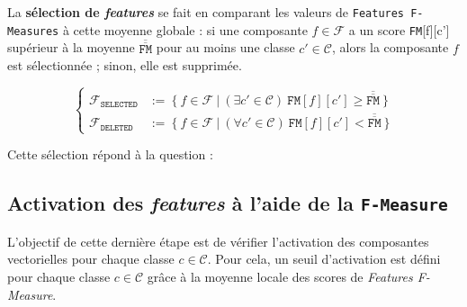 		
		La \textbf{sélection de \textit{features}} se fait en comparant les valeurs de \texttt{Features F-Measures} à cette moyenne globale : si une composante $f \in \mathcal{F}$ a un score \texttt{FM}[f][c'] supérieur à la moyenne $\overline{\overline{\texttt{FM}}}$ pour au moins une classe $c' \in \mathcal{C}$, alors la composante $f$ est sélectionnée ; sinon, elle est supprimée.
		
		\begin{equation}
			\label{equation:C.3.1-DESCRIPTION-IMPLEMENTATION-FEATURES-MAXIMIZATION-METRIC-FEATURES-SELECTION}
			\begin{cases}
				\mathcal{F}_{\texttt{SELECTED}}
					& :=~\bigl\{~
						f \in \mathcal{F}
						~\big|~
						(\exists c' \in \mathcal{C})~\texttt{FM}[f][c'] \geq \overline{\overline{\texttt{FM}}}
					~\bigr\} \\
				\mathcal{F}_{\texttt{DELETED}}
					& :=~\bigl\{~
						f \in \mathcal{F}
						~\big|~
						(\forall c' \in \mathcal{C})~\texttt{FM}[f][c'] < \overline{\overline{\texttt{FM}}}
					~\bigr\}
			\end{cases}
		\end{equation}
		
		\begin{leftBarAuthorOpinion}
			Cette sélection répond à la question :
		\end{leftBarAuthorOpinion}
	
	
	\subsection{Activation des \textit{features} à l'aide de la \texttt{F-Measure}}
	\label{annex:C.3.3-DESCRIPTION-IMPLEMENTATION-FEATURES-MAXIMIZATION-METRIC-ACTIVATION-FEATURES}
	
		L'objectif de cette dernière étape est de vérifier l'activation des composantes vectorielles pour chaque classe $c \in \mathcal{C}$.
		Pour cela, un seuil d'activation est défini pour chaque classe $c \in \mathcal{C}$ grâce à la moyenne locale des scores de \textit{Features F-Measure}.
		\newline
		
